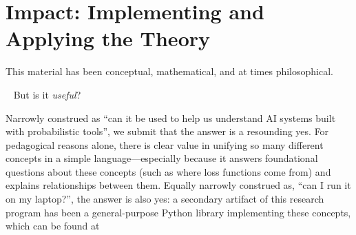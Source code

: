 \section{Impact: Implementing and Applying the Theory}

This material has been conceptual, mathematical, and at times philosophical.
{\par~\hfil
But is it \emph{useful}?
\hfil\par}

Narrowly construed as ``can it be used to help us understand AI systems built with probabilistic tools'', we submit that the answer is a resounding yes. 
For pedagogical reasons alone, there is clear value in unifying so many different concepts 
in a simple language---especially 
    because it answers foundational questions about these concepts (such as where loss functions come from) and explains relationships between them.
Equally narrowly construed as, ``can I run it on my laptop?'', the answer is also yes:
\commentout{%
}%
a secondary artifact of this research program has been a general-purpose Python library implementing these concepts, which can be found at
